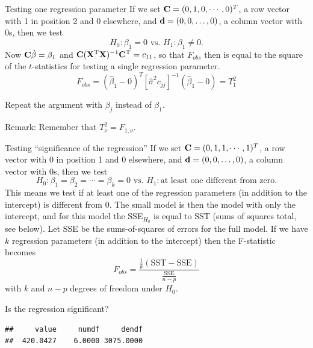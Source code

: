 \documentclass[
  ignorenonframetext,
]{beamer}
\newenvironment{Shaded}{\begin{snugshade}}{\end{snugshade}}
\newcommand{\FunctionTok}[1]{\textcolor[rgb]{0.13,0.29,0.53}{\textbf{#1}}}
\newcommand{\NormalTok}[1]{#1}
\newcommand{\SpecialCharTok}[1]{\textcolor[rgb]{0.81,0.36,0.00}{\textbf{#1}}}
\begin{document}
\begin{frame}
\begin{block}{Testing one regression parameter}
\label{testing-one-regression-parameter}
If we set \({\bf C}=(0,1, 0, \cdots, 0)^T\), a row vector with 1 in
position 2 and 0 elsewhere, and \({\bf d}=(0,0,\ldots,0)\), a column
vector with 0s, then we test
\[ H_0: \beta_1=0 \text{ vs. } H_1: \beta_1\neq 0.\] Now
\({\bf C}\hat{\beta}=\beta_1\) and
\({\bf C}({\bf X}^{\text T}{\bf X})^{-1}{\bf C}^{\text T}=c_{11}\), so
that \(F_{obs}\) then is equal to the square of the \(t\)-statistics for
testing a single regression parameter.
\[F_{obs}=(\hat{\beta}_1-0)^T[\hat{\sigma}^2 c_{jj}]^{-1}(\hat{\beta}_1-0)=T_1^2\]

Repeat the argument with \(\beta_j\) instead of \(\beta_1\).

Remark: Remember that \(T_{\nu}^2=F_{1,\nu}\).
\end{block}
\end{frame}

\begin{frame}
\begin{block}{Testing ``significance of the regression''}
\label{testing-significance-of-the-regression}
If we set \({\bf C}=(0,1,1, \cdots ,1)^T\), a row vector with 0 in
position 1 and 0 elsewhere, and \({\bf d}=(0,0,\ldots,0)\), a column
vector with 0s, then we test
\[ H_0: \beta_1=\beta_2=\cdots= \beta_k =0 \text{ vs. } H_1: \text{at least one different from zero}.\]
This means we test if at least one of the regression parameters (in
addition to the intercept) is different from 0. The small model is then
the model with only the intercept, and for this model the SSE\(_{H_0}\)
is equal to SST (sums of squares total, see below). Let SSE be the
sums-of-squares of errors for the full model. If we have \(k\)
regression parameters (in addition to the intercept) then the
F-statistic becomes
\[ F_{obs}=\frac{\frac{1}{k}(\text{SST}-\text{SSE})}{\frac{\text{SSE}}{n-p}}\]
with \(k\) and \(n-p\) degrees of freedom under \(H_0\).
\end{block}
\end{frame}

\begin{frame}[fragile]
Is the regression significant?

\begin{Shaded}
\end{Shaded}

\begin{verbatim}
##     value     numdf     dendf 
##  420.0427    6.0000 3075.0000
\end{verbatim}
\end{frame}
\end{document}
